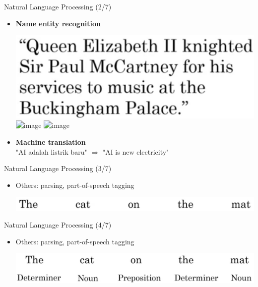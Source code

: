 \documentclass[pdf]{beamer}
\theoremstyle{mystyle}
\begin{document}
\begin{frame}{Natural Language Processing (2/7)}
	\begin{itemize}
		\item \textbf{Name entity recognition }
		\begin{center}
			\includegraphics[scale=.25]{ner} \qquad \includegraphics<2->[scale=.25]{ner-2} \qquad \includegraphics<3->[scale=.25]{ner-3}
		\end{center}
		\item<4-> \textbf{Machine translation} \\
		"AI adalah listrik baru" $\Longrightarrow$ "AI is new electricity"
	\end{itemize}
\end{frame}

\begin{frame}{Natural Language Processing (3/7)}
	\begin{itemize}
		\item Others: parsing, part-of-speech tagging
		\begin{center}
			\includegraphics[scale=.25]{parsing-1} 	
		\end{center}
	\end{itemize}
\end{frame}

\begin{frame}{Natural Language Processing (4/7)}
	\begin{itemize}
		\item Others: parsing, part-of-speech tagging
		\begin{center}
			\includegraphics[scale=.25]{parsing-2} 	
		\end{center}
	\end{itemize}
\end{frame}
\end{document}
